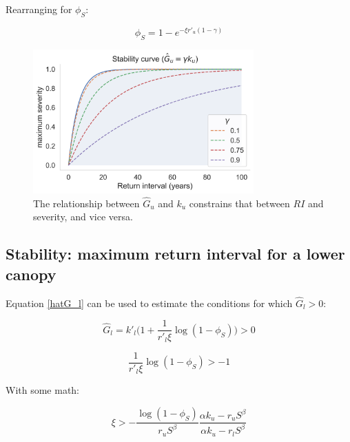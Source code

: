 \documentclass{article}
\begin{document}
        Rearranging for $\phi_S$:
        
        
        \begin{equation}
        \phi_S = 1- e^{-\xi r'_u (1-\gamma)}
        \label{max_severity}
        \end{equation}
        
        
 \begin{figure}[h]
 \centering
\includegraphics[width=20pc]{../fire_plots/stability.png}
 \caption{ The relationship between $\hat G_u$ and $k_u$ constrains that between $RI$ and severity, and vice versa.}
 \label{fig:stability}
 \end{figure}
   
\subsection{Stability: maximum return interval for a lower canopy}


Equation \ref{hatG_l} can be used to estimate the conditions for which $\hat G_l >0$:

\begin{equation}
\hat{G}_l =
 		k'_l \big( 1 + \frac{1}{r'_l \xi} \log(1-\phi_S) \big) > 0
\end{equation}


\begin{equation}
 		\frac{1}{r'_l \xi} \log(1-\phi_S) > -1
\end{equation}

With some math:

\begin{equation}
 	\xi > - \frac{\log(1-\phi_S)}{r_u S^\beta} \frac{\alpha k_u - r_u S^\beta}{\alpha k_u - r_l S^\beta}
\end{equation}
\end{document}
